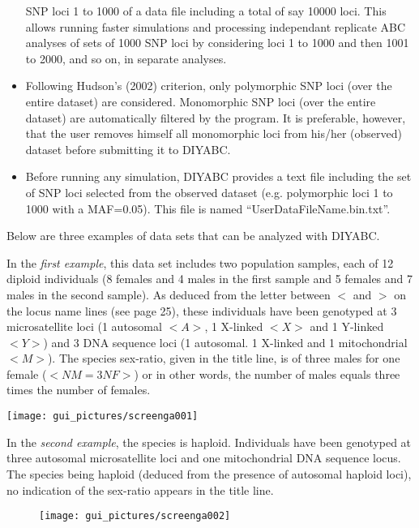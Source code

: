 \begin{itemize}
SNP loci 1 to 1000 of a data file including a total of say 10000 loci.
This allows running faster simulations and processing independant
replicate ABC analyses of sets of 1000 SNP loci by considering loci
1 to 1000 and then 1001 to 2000, and so on, in separate analyses.
\item Following Hudson's (2002) criterion, only polymorphic SNP loci (over
the entire dataset) are considered. Monomorphic SNP loci (over the
entire dataset) are automatically filtered by the program. It is preferable,
however, that the user removes himself all monomorphic loci from his/her
(observed) dataset before submitting it to DIYABC.
\item Before running any simulation, DIYABC provides a text file including
the set of SNP loci selected from the observed dataset (e.g. polymorphic
loci 1 to 1000 with a MAF=0.05). This file is named ``UserDataFileName.bin.txt''.
\end{itemize}
Below are three examples of data sets that can be analyzed with DIYABC.

In the \textit{first example}, this data set includes two population
samples, each of 12 diploid individuals (8 females and 4 males in
the first sample and 5 females and 7 males in the second sample).
As deduced from the letter between $<$ and $>$ on the locus name
lines (see page 25), these individuals have been genotyped at 3 microsatellite
loci (1 autosomal $<A>$, 1 X-linked $<X>$ and 1 Y-linked $<Y>$)
and 3 DNA sequence loci (1 autosomal. 1 X-linked and 1 mitochondrial
$<M>$). The species sex-ratio, given in the title line, is of three
males for one female ($<NM=3NF>$) or in other words, the number of
males equals three times the number of females.

\texttt{[image: gui\_pictures/screenga001]}

\newpage{}In the \textit{second example}, the species is haploid.
Individuals have been genotyped at three autosomal microsatellite
loci and one mitochondrial DNA sequence locus. The species being haploid
(deduced from the presence of autosomal haploid loci), no indication
of the sex-ratio appears in the title line.

\begin{figure}[h]
\texttt{[image: gui\_pictures/screenga002]}
\end{figure}




